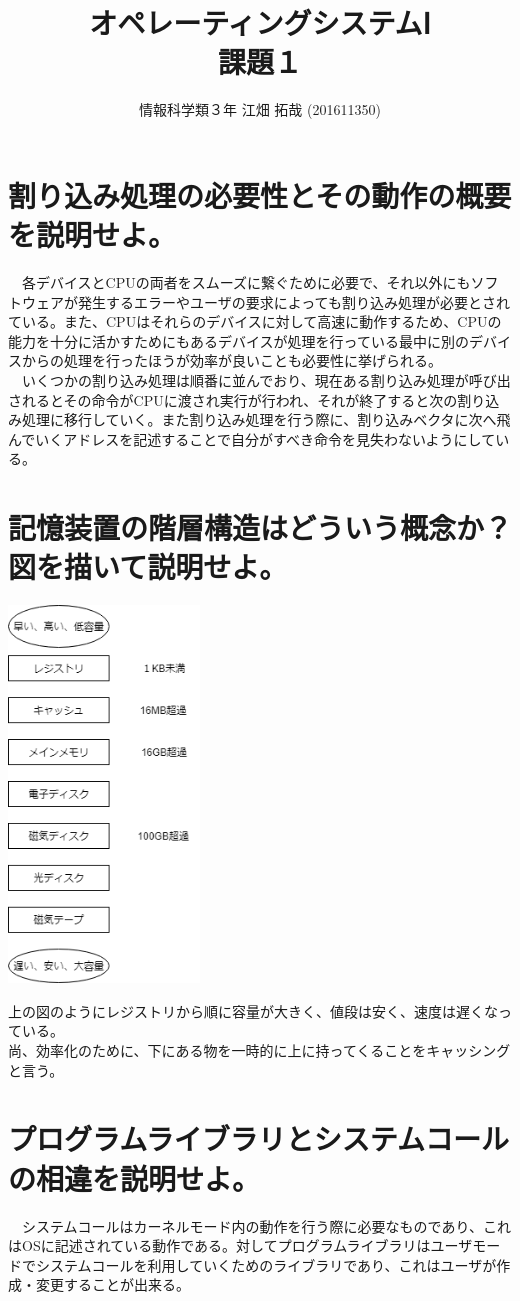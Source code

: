 \documentclass{scrartcl}
\author{情報科学類３年 江畑 拓哉 (201611350)}
\date{}
\title{オペレーティングシステムⅠ\\\medskip
\large 課題１}
\begin{document}
\maketitle
\section{割り込み処理の必要性とその動作の概要を説明せよ。}
\label{sec:orgef9c163}
　各デバイスとCPUの両者をスムーズに繋ぐために必要で、それ以外にもソフトウェアが発生するエラーやユーザの要求によっても割り込み処理が必要とされている。また、CPUはそれらのデバイスに対して高速に動作するため、CPUの能力を十分に活かすためにもあるデバイスが処理を行っている最中に別のデバイスからの処理を行ったほうが効率が良いことも必要性に挙げられる。\\
　いくつかの割り込み処理は順番に並んでおり、現在ある割り込み処理が呼び出されるとその命令がCPUに渡され実行が行われ、それが終了すると次の割り込み処理に移行していく。また割り込み処理を行う際に、割り込みベクタに次へ飛んでいくアドレスを記述することで自分がすべき命令を見失わないようにしている。\\
\section{記憶装置の階層構造はどういう概念か？図を描いて説明せよ。}
\label{sec:orgb35de0d}
\begin{center}
\includegraphics[height=10cm]{./1.png}
\end{center}
上の図のようにレジストリから順に容量が大きく、値段は安く、速度は遅くなっている。\\
尚、効率化のために、下にある物を一時的に上に持ってくることをキャッシングと言う。\\
\section{プログラムライブラリとシステムコールの相違を説明せよ。}
\label{sec:org58cf1f9}
　システムコールはカーネルモード内の動作を行う際に必要なものであり、これはOSに記述されている動作である。対してプログラムライブラリはユーザモードでシステムコールを利用していくためのライブラリであり、これはユーザが作成・変更することが出来る。\\
\end{document}
